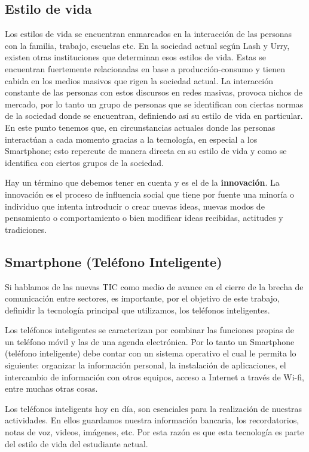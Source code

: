 	\subsection{Estilo de vida}
	Los estilos de vida se encuentran enmarcados en la interacción de las personas con la familia, trabajo, escuelas etc. En la sociedad actual según Lash y Urry, existen otras instituciones que determinan esos estilos de vida. Estas se encuentran fuertemente relacionadas en base a producción-consumo y tienen cabida en los medios masivos que rigen la sociedad actual. La interacción constante de las personas con estos discursos en redes masivas, provoca nichos de mercado, por lo tanto un grupo de personas que se identifican con ciertas normas de la sociedad donde se encuentran, definiendo así su estilo de vida en particular. En este punto tenemos que, en circunstancias actuales donde las personas interactúan a cada momento gracias a la tecnología, en especial a los Smartphone; esto repercute de manera directa en su estilo de vida y como se identifica con ciertos grupos de la sociedad. 
	
	Hay un término que debemos tener en cuenta y es el de la \textbf{innovación}. La innovación  es el proceso de influencia social que tiene por fuente una minoría o individuo que intenta introducir o crear nuevas ideas, nuevas modos de pensamiento o comportamiento o bien modificar ideas recibidas, actitudes y tradiciones.
	 
	\subsection{Smartphone (Teléfono Inteligente)}
	Si hablamos de las nuevas TIC como medio de avance en el cierre de la brecha de comunicación entre sectores, es importante,  por el objetivo de este trabajo, definidir la tecnología principal que utilizamos, los teléfonos inteligentes.
	
	Los teléfonos inteligentes se caracterizan por combinar las funciones propias de un teléfono móvil y las de una agenda electrónica. Por lo tanto un Smartphone (teléfono inteligente) debe contar con un sistema operativo el cual le permita lo siguiente:
	organizar la información personal, la instalación de aplicaciones, el intercambio de información con otros equipos, acceso a Internet a través de Wi-fi, entre muchas otras cosas.
	
	Los teléfonos inteligents hoy en día, son esenciales para la realización de nuestras actividades. En ellos guardamos nuestra información bancaria, los recordatorios, notas de voz, videos, imágenes, etc. Por esta razón es que esta tecnología es parte del estilo de vida del estudiante actual.

